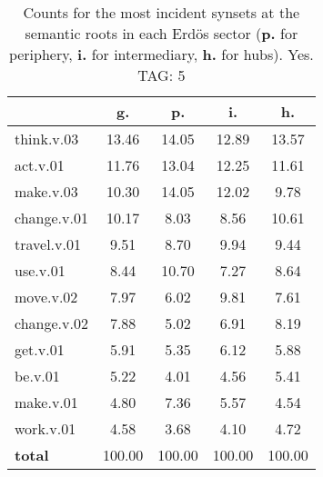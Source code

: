 \begin{table}[h!]
\begin{center}
\begin{tabular}{| l || c | c | c | c |}\hline
 & {\bf g.} & {\bf p.} & {\bf i.} & {\bf h.} \\\hline\hline
think.v.03 & 13.46  & 14.05  & 12.89  & 13.57 \\\hline
act.v.01 & 11.76  & 13.04  & 12.25  & 11.61 \\\hline
make.v.03 & 10.30  & 14.05  & 12.02  & 9.78 \\\hline
change.v.01 & 10.17  & 8.03  & 8.56  & 10.61 \\\hline
travel.v.01 & 9.51  & 8.70  & 9.94  & 9.44 \\\hline
use.v.01 & 8.44  & 10.70  & 7.27  & 8.64 \\\hline
move.v.02 & 7.97  & 6.02  & 9.81  & 7.61 \\\hline
change.v.02 & 7.88  & 5.02  & 6.91  & 8.19 \\\hline
get.v.01 & 5.91  & 5.35  & 6.12  & 5.88 \\\hline
be.v.01 & 5.22  & 4.01  & 4.56  & 5.41 \\\hline
make.v.01 & 4.80  & 7.36  & 5.57  & 4.54 \\\hline
work.v.01 & 4.58  & 3.68  & 4.10  & 4.72 \\\hline\hline
{{\bf total}} & 100.00  & 100.00  & 100.00  & 100.00 \\\hline
\end{tabular}
\caption{Counts for the most incident synsets at the semantic roots in each Erd\"os sector ({\bf p.} for periphery, {\bf i.} for intermediary, {\bf h.} for hubs). Yes. TAG: 5}
\end{center}
\end{table}